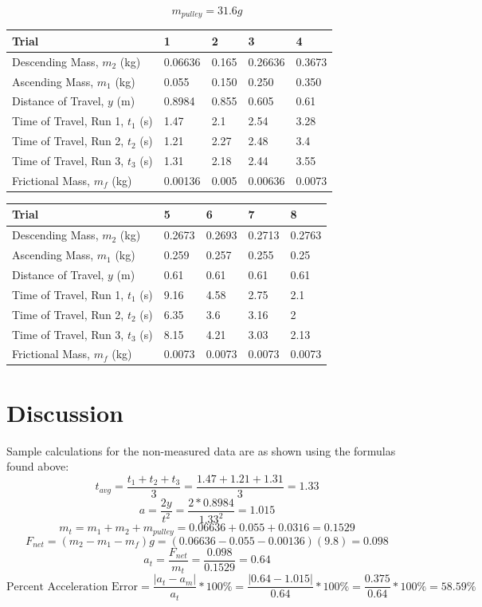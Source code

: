 \documentclass[11pt, titlepage]{article}
\begin{document}
\begin{center}
$$m_{pulley} = 31.6 g$$
\begin{tabular}
{|m{7em}|m{7em}|m{7em}|m{7em}|m{7em}|}
\hline
Trial & 1 & 2 & 3 & 4 \\
\hline
Descending Mass, $m_2$ (kg) & 0.06636 & 0.165 & 0.26636 & 0.3673\\
\hline
Ascending Mass, $m_1$ (kg) & 0.055 & 0.150 & 0.250 & 0.350\\
\hline
Distance of Travel, $y$ (m) & 0.8984 & 0.855 & 0.605 & 0.61\\
\hline
Time of Travel, Run 1, $t_1$ (s) & 1.47 & 2.1 & 2.54 & 3.28\\
\hline
Time of Travel, Run 2, $t_2$ (s) & 1.21 & 2.27 & 2.48 & 3.4\\
\hline
Time of Travel, Run 3, $t_3$ (s) & 1.31 & 2.18 & 2.44 & 3.55\\
\hline
Frictional Mass, $m_f$ (kg) & 0.00136 & 0.005 & 0.00636 & 0.0073\\
\hline
\end{tabular}
\begin{tabular}
{|m{7em}|m{7em}|m{7em}|m{7em}|m{7em}|}
\hline
Trial & 5 & 6 & 7 & 8 \\
\hline
Descending Mass, $m_2$ (kg) & 0.2673 & 0.2693 & 0.2713& 0.2763\\
\hline
Ascending Mass, $m_1$ (kg) & 0.259 & 0.257 & 0.255 & 0.25\\
\hline
Distance of Travel, $y$ (m) & 0.61 & 0.61 & 0.61 & 0.61\\
\hline
Time of Travel, Run 1, $t_1$ (s) & 9.16& 4.58& 2.75& 2.1\\
\hline
Time of Travel, Run 2, $t_2$ (s) & 6.35& 3.6 & 3.16 & 2\\
\hline
Time of Travel, Run 3, $t_3$ (s) & 8.15& 4.21 & 3.03 & 2.13\\
\hline
Frictional Mass, $m_f$ (kg) & 0.0073 & 0.0073 & 0.0073 & 0.0073\\
\hline
\end{tabular}
\end{center}

\section*{Discussion}
Sample calculations for the non-measured data are as shown using the formulas found above:
$$t_{avg} = \frac{t_1 + t_2 + t_3}{3} = \frac{1.47 + 1.21 + 1.31}{3} = 1.33$$
$$a = \frac{2y}{t^2} = \frac{2*0.8984}{1.33^2} = 1.015$$
$$m_t = m_1 + m_2 + m_{pulley} = 0.06636 + 0.055 + 0.0316 = 0.1529$$
$$F_{net} = (m_2 - m_1 - m_f)g = (0.06636 - 0.055 - 0.00136)(9.8) = 0.098$$
$$a_t = \frac{F_{net}}{m_t} = \frac{0.098}{0.1529} = 0.64$$
$$\text{Percent Acceleration Error} = \frac{|a_t - a_m|}{a_t}*100\% = \frac{|0.64 - 1.015|}{0.64}*100\% = \frac{0.375}{0.64}*100\% = 58.59\%$$
\end{document}
